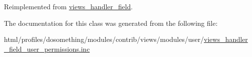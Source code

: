 Reimplemented from \hyperlink{classviews__handler__field_a4f661f91bcbe80d4a00c30a31456c502}{views\_\-handler\_\-field}.

The documentation for this class was generated from the following file:\begin{DoxyCompactItemize}
\item 
html/profiles/dosomething/modules/contrib/views/modules/user/\hyperlink{views__handler__field__user__permissions_8inc}{views\_\-handler\_\-field\_\-user\_\-permissions.inc}\end{DoxyCompactItemize}
